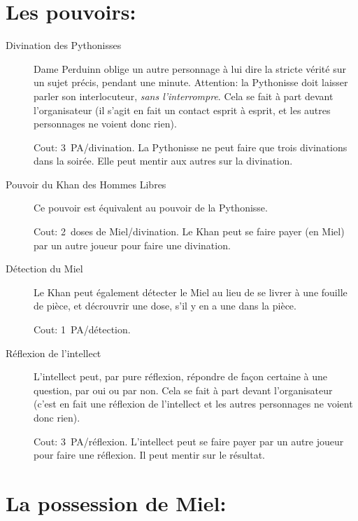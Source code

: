 \documentclass{article}
\begin{document}
\section*{Les pouvoirs:}

\begin{description}
    \item[Divination des Pythonisses] Dame Perduinn oblige un autre personnage
        à lui dire la stricte vérité sur un sujet précis, pendant une minute.
        Attention: la Pythonisse doit laisser parler son interlocuteur,
        \emph{sans l'interrompre}.  Cela se fait à part devant l'organisateur
        (il s'agit en fait un contact esprit à esprit, et les autres
        personnages ne \og voient\fg{} donc rien).

        Cout: 3~PA/divination. La Pythonisse ne peut faire que trois
        divinations dans la soirée. Elle peut mentir aux autres sur la
        divination.

    \item[Pouvoir du Khan des Hommes Libres] Ce pouvoir est équivalent au
        pouvoir de la Pythonisse.

        Cout: 2~doses de Miel/divination. Le Khan peut se faire payer (en
        Miel) par un autre joueur pour faire une divination.

    \item[Détection du Miel] Le Khan peut également \og détecter le Miel\fg{}
        au lieu de se livrer à une fouille de pièce, et décrouvrir une dose,
        s'il y en a une dans la pièce.

        Cout: 1~PA/détection.

    \item[Réflexion de l'intellect] L'intellect peut, par pure réflexion,
        répondre de façon certaine à une question, par oui ou par non. Cela se
        fait à part devant l'organisateur (c'est en fait une réflexion de
        l'intellect et les autres personnages ne \og voient\fg{} donc rien).

        Cout: 3~PA/réflexion. L'intellect peut se faire payer par un autre
        joueur pour faire une réflexion. Il peut mentir sur le résultat.

\end{description}

\section*{La possession de Miel:}
\end{document}
